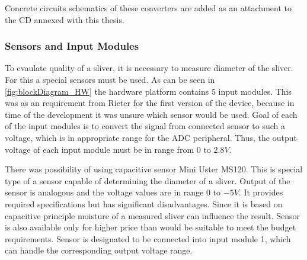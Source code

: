 \documentclass[twoside]{ctuthesis}
\theoremstyle{plain}
\theoremstyle{definition}
\theoremstyle{note}
\begin{document}
Concrete circuits schematics of these converters are added as an attachment to the CD annexed with this thesis.

\subsubsection{Sensors and Input Modules}
\label{sec:Sensors}
To evaulate quality of a sliver, it is necessary to measure diameter of the sliver. For this a special sensors must be used. 
As can be seen in \ref{fig:blockDiagram_HW} the hardware platform contains 5 input modules. This was as an requirement from Rieter for the first version of the device, because in time of the development it was unsure which sensor would be used. Goal of each of the input modules is to convert the signal from connected sensor to such a voltage, which is in appropriate range for the ADC peripheral. Thus, the output voltage of each input module must be in range from $0$ to $2.8V$.

There was possibility of using capacitive sensor Mini Uster MS120. This is special type of a sensor capable of determining the diameter of a sliver. Output of the sensor is analogous and the voltage values are in range $0$ to $-5V$. It provides required specifications but has significant disadvantages. Since it is based on capacitive principle moisture of a measured sliver can influence the result. Sensor is also available only for higher price than would be suitable to meet the budget requirements. Sensor is designated to be connected into input module 1, which can handle the corresponding output voltage range.
\end{document}
